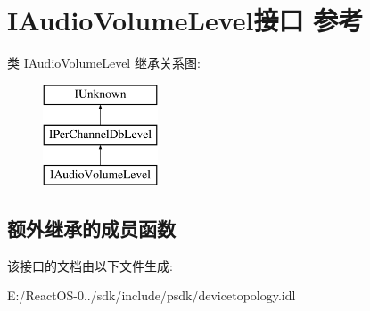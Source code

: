 \hypertarget{interface_i_audio_volume_level}{}\section{I\+Audio\+Volume\+Level接口 参考}
\label{interface_i_audio_volume_level}
类 I\+Audio\+Volume\+Level 继承关系图\+:\begin{figure}[H]
\begin{center}
\leavevmode
\includegraphics[height=3.000000cm]{interface_i_audio_volume_level}
\end{center}
\end{figure}
\subsection*{额外继承的成员函数}


该接口的文档由以下文件生成\+:\begin{DoxyCompactItemize}
\item 
E\+:/\+React\+O\+S-\/0../sdk/include/psdk/devicetopology.\+idl\end{DoxyCompactItemize}
